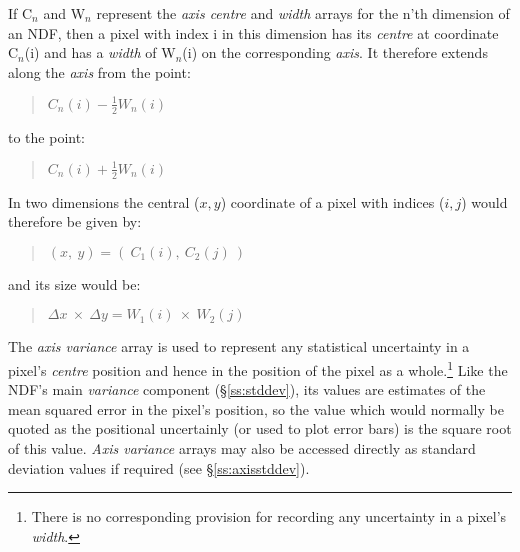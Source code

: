 \documentclass[twoside,11pt,nolof]{starlink}
\providecommand{\st}[1]{{\emph{#1}}}
\begin{document}
If C$_{n}$ and W$_{n}$ represent the \st{axis centre\/} and \st{width\/}
arrays for the n'th dimension of an NDF, then a pixel with index i in this
dimension has its \st{centre\/} at coordinate C$_{n}$(i) and has a
\st{width\/} of W$_{n}$(i) on the corresponding \st{axis}.
It therefore extends along the \st{axis\/} from the point:

\small
\begin{quote}
\begin{center}
$C_{n}(i) - \frac{1}{2} W_{n}(i)$
\end{center}
\end{quote}
\normalsize

to the point:

\small
\begin{quote}
\begin{center}
$C_{n}(i) + \frac{1}{2} W_{n}(i)$
\end{center}
\end{quote}
\normalsize

In two dimensions the central ($x,y$) coordinate of a pixel with indices
($i,j$) would therefore be given by:

\small
\begin{quote}
\begin{center}
$(x,\: y) = (\: C_{1}(i),\: C_{2}(j) \: )$
\end{center}
\end{quote}
\normalsize

and its size would be:

\small
\begin{quote}
\begin{center}
$\Delta x \: \times \: \Delta y = W_{1}(i) \: \times \: W_{2}(j)$
\end{center}
\end{quote}
\normalsize

The \st{axis variance\/} array is used to represent any statistical
uncertainty in a pixel's \st{centre\/} position and hence in the position
of the pixel as a whole.\footnote{There is no corresponding provision for
recording any uncertainty in a pixel's \st{width}.}
Like the NDF's main \st{variance\/} component (\S\ref{ss:stddev}), its
values are estimates of the mean squared error in the pixel's position, so
the value which would normally be quoted as the positional uncertainly (or
used to plot error bars) is the square root of this value.
\st{Axis variance\/} arrays may also be accessed directly as standard
deviation values if required (see \S\ref{ss:axisstddev}).
\end{document}

